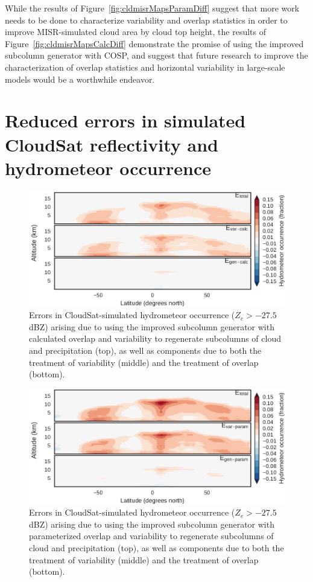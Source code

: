 While the results of Figure~\ref{fig:cldmisrMapsParamDiff} suggest that
more work needs to be done to characterize variability and overlap
statistics in order to improve MISR-simulated cloud area by cloud top
height, the results of Figure~\ref{fig:cldmisrMapsCalcDiff} demonstrate
the promise of using the improved subcolumn generator with COSP, and
suggest that future research to improve the characterization of overlap
statistics and horizontal variability in large-scale models would be a
worthwhile endeavor.

\section{Reduced errors in simulated CloudSat reflectivity and
hydrometeor occurrence}\label{sec:subgrid2Active}

\begin{figure}[htbp]
\centering
\includegraphics{graphics/subgrid2_hfba_zonal_gen-var-calc_diff.pdf}
\caption{\label{fig:hfbaZonalCalcDiff}Errors in CloudSat-simulated
hydrometeor occurrence (\(Z_e > -27.5\) dBZ) arising due to using the
improved subcolumn generator with calculated overlap and variability to
regenerate subcolumns of cloud and precipitation (top), as well as
components due to both the treatment of variability (middle) and the
treatment of overlap (bottom).}\label{fig:hfbaZonalCalcDiff}
\end{figure}

\begin{figure}[htbp]
\centering
\includegraphics{graphics/subgrid2_hfba_zonal_gen-var-param_diff.pdf}
\caption{\label{fig:hfbaZonalParamDiff}Errors in CloudSat-simulated
hydrometeor occurrence (\(Z_e > -27.5\) dBZ) arising due to using the
improved subcolumn generator with parameterized overlap and variability
to regenerate subcolumns of cloud and precipitation (top), as well as
components due to both the treatment of variability (middle) and the
treatment of overlap (bottom).}\label{fig:hfbaZonalParamDiff}
\end{figure}

